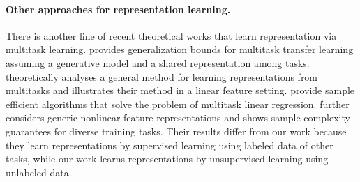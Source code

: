 




\paragraph{Other approaches for representation learning.} There is another line of recent theoretical works that learn representation via multitask learning. \citet{Baxter_2000} provides generalization bounds for multitask transfer learning assuming a generative model and a shared representation among tasks. \citet{JMLR:v17:15-242} theoretically analyses a general method for learning representations from multitasks and illustrates their method in a linear feature setting. \citet{tripuraneni2021provable,du2020few} provide sample efficient algorithms that solve the problem of multitask linear regression. \citet{tripuraneni2020theory} further considers generic nonlinear feature representations and shows sample complexity guarantees for diverse training tasks. Their results differ from our work because they learn representations by supervised learning using labeled data of other tasks, while our work learns representations by unsupervised learning using unlabeled data.


